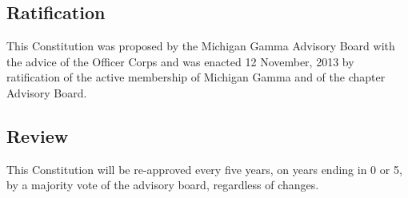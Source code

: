 \subsection{Ratification}
This Constitution was proposed by the Michigan Gamma Advisory Board with the advice of the Officer Corps and was enacted 12 November, 2013 by ratification of the active membership of Michigan Gamma and of the chapter Advisory Board.
\subsection{Review}
This Constitution will be re-approved every five years, on years ending in 0 or 5, by a majority vote of the advisory board, regardless of changes.